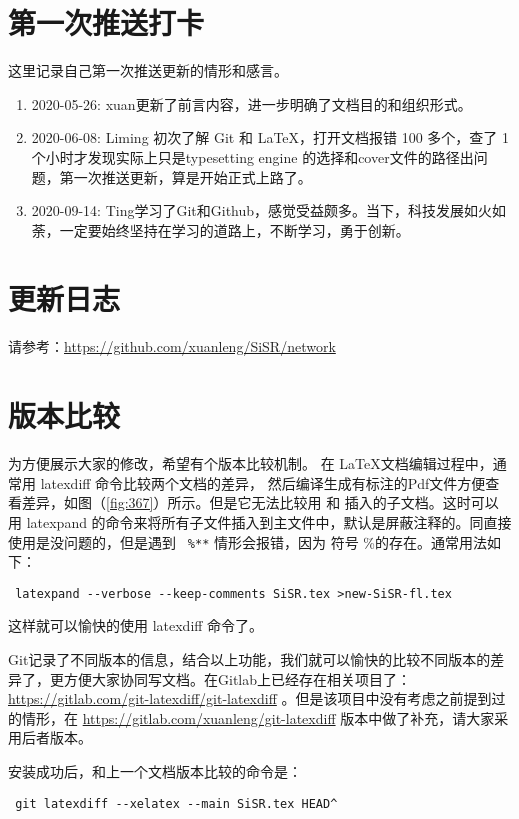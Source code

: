 \documentclass[cn,11pt,chinese,twoside]{elegantbook}
\begin{document}
\section*{第一次推送打卡}
这里记录自己第一次推送更新的情形和感言。
\begin{enumerate}
\item 2020-05-26: xuan更新了前言内容，进一步明确了文档目的和组织形式。
\item 2020-06-08: Liming 初次了解 Git 和 \LaTeX{}，打开文档报错 100 多个，查了 1 个小时才发现实际上只是typesetting engine 的选择和cover文件的路径出问题，第一次推送更新，算是开始正式上路了。
\item 2020-09-14: Ting学习了Git和Github，感觉受益颇多。当下，科技发展如火如荼，一定要始终坚持在学习的道路上，不断学习，勇于创新。
\end{enumerate}


\section*{更新日志}
请参考：\url{https://github.com/xuanleng/SiSR/network}


\section*{版本比较}
为方便展示大家的修改，希望有个版本比较机制。 在 \LaTeX 文档编辑过程中，通常用 latexdiff  命令比较两个文档的差异， 然后编译生成有标注的Pdf文件方便查看差异，如图（\ref{fig:367}）所示。但是它无法比较用 \verb|| 和 \verb|| 插入的子文档。这时可以用 latexpand 的命令来将所有子文件插入到主文件中，默认是屏蔽注释的。同直接使用是没问题的，但是遇到 \verb| %**|
 情形会报错，因为 符号 \%的存在。通常用法如下：
\begin{verbatim}
 latexpand --verbose --keep-comments SiSR.tex >new-SiSR-fl.tex
\end{verbatim}
这样就可以愉快的使用 latexdiff 命令了。

Git记录了不同版本的信息，结合以上功能，我们就可以愉快的比较不同版本的差异了，更方便大家协同写文档。在Gitlab上已经存在相关项目了：
\url{https://gitlab.com/git-latexdiff/git-latexdiff} 。但是该项目中没有考虑之前提到过的情形，在 
\url{https://gitlab.com/xuanleng/git-latexdiff} 版本中做了补充，请大家采用后者版本。

安装成功后，和上一个文档版本比较的命令是：
\begin{verbatim}
 git latexdiff --xelatex --main SiSR.tex HEAD^
\end{verbatim}
\end{document}
